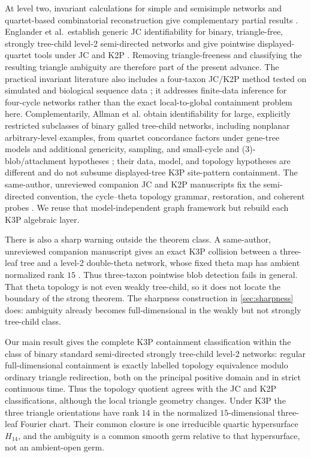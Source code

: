 At level two, invariant calculations for
simple and semisimple networks and quartet-based combinatorial reconstruction
give complementary partial results
\cite{Ardiyansyah2021,HoltgrefeEtAl2025Quartets}.  Englander et
al.~establish generic JC identifiability for binary, triangle-free, strongly
tree-child level-2 semi-directed networks and give pointwise
displayed-quartet tools under JC and K2P
\cite{EnglanderEtAl2026}.  Removing triangle-freeness and classifying the
resulting triangle ambiguity are therefore part of the present advance.  The
practical invariant literature also includes a four-taxon JC/K2P method tested
on simulated and biological sequence data \cite{MartinEtAl2026}; it addresses
finite-data inference for four-cycle networks rather than the exact
local-to-global containment problem here.  Complementarily, Allman et al.
obtain identifiability for large, explicitly restricted subclasses of binary
galled tree-child networks, including nonplanar arbitrary-level examples,
from quartet concordance factors under gene-tree models and additional
genericity, sampling, and small-cycle and (3)-blob/attachment hypotheses
\cite{AllmanEtAl2025}; their
data, model, and topology hypotheses are different and do not subsume
displayed-tree K3P site-pattern containment.  The same-author, unreviewed
companion JC and K2P
manuscripts fix the semi-directed convention, the cycle--theta topology
grammar, restoration, and coherent probes
\cite{KriebelJC2026,KriebelK2P2026}.  We reuse that model-independent graph
framework but rebuild each K3P algebraic layer.

There is also a sharp warning outside the theorem class.  A same-author,
unreviewed companion manuscript gives an exact K3P collision between a
three-leaf tree and a level-2 double-theta network, whose fixed theta map has
ambient normalized rank \(15\) \cite{KriebelTreeTheta2026}.  Thus three-taxon
pointwise blob detection fails in general.  That theta topology is not even
weakly tree-child, so it does not locate the boundary of the strong theorem.
The sharpness construction in \cref{sec:sharpness} does: ambiguity already
becomes full-dimensional in the weakly but not strongly tree-child class.

Our main result gives the complete K3P containment classification within the
class of binary standard semi-directed strongly tree-child level-2 networks:
regular full-dimensional containment is exactly labelled topology equivalence modulo
ordinary triangle redirection, both on the principal positive domain and in
strict continuous time.  Thus the topology quotient agrees with the JC and
K2P classifications, although the local triangle geometry changes.  Under
K3P the three triangle orientations have rank
\(14\) in the normalized \(15\)-dimensional three-leaf Fourier chart.  Their
common closure is one irreducible quartic hypersurface \(H_{14}\), and the
ambiguity is a common smooth germ relative to that hypersurface, not an
ambient-open germ.

